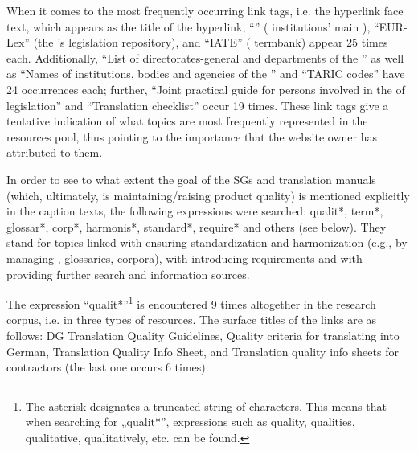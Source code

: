 \documentclass[output=paper]{langsci/langscibook}
\begin{document}
When it comes to the most frequently occurring link tags, i.e. the hyperlink face text, which appears as the title of the hyperlink, “” ( institutions’ main ), “EUR-Lex” (the ’s legislation repository), and “IATE” ( termbank) appear 25 times each. Additionally, “List of directorates-general and departments of the ” as well as “Names of institutions, bodies and agencies of the ” and “TARIC codes” have 24 occurrences each; further, “Joint practical guide for persons involved in the  of  legislation” and “Translation checklist” occur 19 times. These link tags give a tentative indication of what topics are most frequently represented in the resources pool, thus pointing to the importance that the website owner has attributed to them.


In order to see to what extent the goal of the SGs and translation manuals (which, ultimately, is maintaining/raising product quality) is mentioned explicitly in the caption texts, the following expressions were searched: qualit*, term*, glossar*, corp*, harmonis*, standard*, require* and others (see below). They stand for topics linked with ensuring standardization and harmonization (e.g., by managing , glossaries, corpora), with introducing requirements and with providing further search and information sources.


The expression “qualit*”\footnote{The asterisk designates a truncated string of characters. This means that when searching for „qualit*”, expressions such as quality, qualities, qualitative, qualitatively, etc. can be found.} is encountered 9 times altogether in the research corpus, i.e. in three types of resources. The surface titles of the links are as follows: DG Translation Quality Guidelines, Quality criteria for translating into German, Translation Quality Info Sheet, and Translation quality info sheets for contractors (the last one occurs 6 times). 

\end{document}
